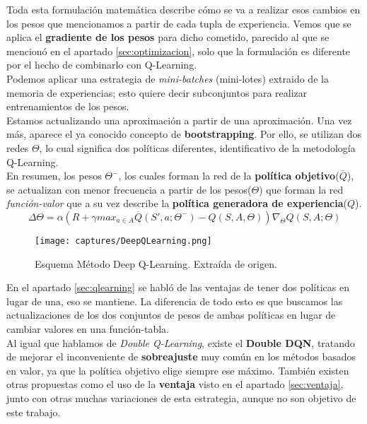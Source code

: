\documentclass[11pt,fleqn]{book} %
\begin{document}
Toda esta formulación matemática describe cómo se va a realizar esos cambios en los pesos que mencionamos a partir de cada tupla de experiencia. Vemos que se aplica el \textbf{gradiente de los pesos} para dicho cometido, parecido al que se mencionó en el apartado \ref{sec:optimizacion}, solo que la formulación es diferente por el hecho de combinarlo con Q-Learning.\\

Podemos aplicar una estrategia de \textit{mini-batches} (mini-lotes) extraido de la memoria de experiencias; esto quiere decir subconjuntos para realizar entrenamientos de los pesos.  \\

Estamos actualizando una aproximación a partir de una aproximación. Una vez más, aparece el ya conocido concepto de \textbf{bootstrapping}. Por ello, se utilizan dos redes $\Theta$, lo cual significa dos políticas diferentes, identificativo de la metodología Q-Learning. \\

En resumen, los pesos $\Theta^-$, los cuales forman la red de la \textbf{política objetivo}($\overline{Q}$), se actualizan con menor frecuencia a partir de los pesos($\Theta$) que forman la red \textit{función-valor} que a su vez describe la \textbf{política generadora de experiencia}($Q$). \\

\begin{equation*}
\Delta\Theta=\alpha(R+\gamma max_{a \in A} \overline{Q}(S',a;\Theta^-)-Q(S,A,\Theta))\nabla_\Theta Q(S,A;\Theta)
\end{equation*}

\begin{figure}[H]
	\centering\texttt{[image: captures/DeepQLearning.png]}
	\caption{Esquema Método Deep Q-Learning. Extraída de origen. \cite{book:barto} \cite{article:RLromero}}
	\label{fig:deepqlearning} %
\end{figure}

En el apartado \ref{sec:qlearning} se habló de las ventajas de tener dos políticas en lugar de una, eso se mantiene. La diferencia de todo esto es que buscamos las actualizaciones de los dos conjuntos de pesos de ambas políticas en lugar de cambiar valores en una función-tabla. \\

Al igual que hablamos de \textit{Double Q-Learning}, existe el \textbf{Double DQN}, tratando de mejorar el inconveniente de \textbf{sobreajuste} muy común en los métodos basados en valor, ya que la política objetivo elige siempre ese máximo. También existen otras propuestas como el uso de la \textbf{ventaja} visto en el apartado \ref{sec:ventaja}, junto con otras muchas variaciones de esta estrategia, aunque no son objetivo de este trabajo.
\end{document}

